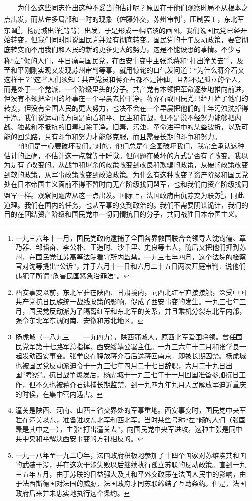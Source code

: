 \documentclass[cn,11pt,chinese]{elegantbook}
\begin{document}
　　为什么这些同志作出这种不妥当的估计呢？原因在于他们观察时局不从根本之点出发，而从许多局部和一时的现象（佐藤外交，苏州审判\footnote[4]{ 一九三六年十一月，国民党政府逮捕了全国各界救国联合会领导人沈钧儒、章乃器、邹韬奋、李公朴、王造时、沙千里、史良等七人，随后又把他们押到苏州，在国民党江苏高等法院看守所内监禁。一九三七年四月，这个法院的检察官对沈等提出“公诉”，并于六月十一日和六月二十五日两次开庭审判，说他们违犯了所谓“危害民国紧急治罪法”。}，压制罢工，东北军东调\footnote[5]{ 西安事变以前，东北军驻在陕西、甘肃境内，同西北红军直接接触，深受中国共产党抗日民族统一战线政策的影响，促成了西安事变的发生。一九三七年三月，国民党反动派为了隔离红军和东北军的关系，并且乘机分裂东北军内部，强令东北军东调河南、安徽和苏北地区。}，杨虎城出洋\footnote[6]{ 杨虎城（一八九三——一九四九），陕西蒲城人，原西北军爱国将领。曾任国民党军第十七路军总指挥、西安绥靖公署主任。一九三六年十二月和张学良一起发动西安事变。张学良在释放蒋介石后送蒋回南京，即被长期囚禁。杨虎城也被国民党反动派迫令于一九三七年四月二十七日辞职，六月二十九日出国“考察”。抗日战争爆发后，杨虎城于一九三七年十一月回国准备参加抗日工作，但不久也被蒋介石逮捕长期监禁，到一九四九年九月人民解放军迫近重庆的时候，在集中营内遇害。}等等）出发，于是形成一幅暗淡的画图。我们说国民党已经开始转变，但我们同时即说国民党并没有彻底转变。国民党的十年反动政策，要它彻底转变而不用我们和人民的新的更多更大的努力，这是不能设想的事情。不少号称“左”倾的人们，平日痛骂国民党，在西安事变中主张杀蒋和“打出潼关去”\footnote[7]{ 潼关是陕西、河南、山西三省交界处的军事重地。西安事变时，国民党中央军驻在潼关以东，准备进攻东北军和西北军。当时某些号称“左”倾的人们（张国焘是其中之一），主张“打出潼关去”，向国民党中央军进攻。这种主张是同中共中央和平解决西安事变的方针相反的。}，及至和平刚刚实现又发现苏州审判等事，就用惊诧的口气发问道：“为什么蒋介石又这样干？”这些人们须知：共产党员和蒋介石都不是神仙，且都不是孤立的个人，而是处于一个党派、一个阶级里头的分子。共产党有本领把革命逐步地推向前进，但没有本领把全国的坏事在一个早晨去掉干净。蒋介石或国民党已经开始了他们的转变，但没有全国人民的更大努力，也决不会在一个早晨把他们的十年污浊洗掉得干净。我们说运动的方向是向着和平、民主和抗战，但不是说不经努力能够把内战、独裁和不抵抗的旧毒扫除干净。旧毒，污浊，革命进程中的某些波折，以及可能的回头路，只有斗争和努力才能够克服，而且需要长期的斗争和努力。\\
　　“他们是一心要破坏我们。”对的，他们总是在企图破坏我们，我完全承认这种估计的正确，不估计这一点就等于睡觉。但问题在破坏的方式是否有了改变。我以为是有了改变的。从战争和屠杀的政策改变到改良和欺骗的政策，从硬的政策改变到软的政策，从军事政策改变到政治政策。为什么有这种改变？资产阶级和国民党处在日本帝国主义面前不得不暂时向无产阶级找同盟军，也和我们向资产阶级找同盟军一样。观察问题应从这一点出发。国际上，法国政府由仇苏变为联苏\footnote[8]{ 一九一八年至一九二〇年，法国政府积极地参加了十四个国家对苏维埃共和国的武装干涉，并在这次干涉失败以后继续执行孤立苏联的反动政策。直到一九三五年五月，由于苏联的日益强大及其和平外交政策在法国人民中的影响，由于法西斯德国对法国的威胁，法国政府才同苏联缔结了互助条约。但是，法国政府后来并未忠实地执行这个条约。}，同此道理。我们在国内的任务，也从军事的变到政治的。我们不需要阴谋诡计，我们的目的在团结资产阶级和国民党中一切同情抗日的分子，共同战胜日本帝国主义。\\
\end{document}
